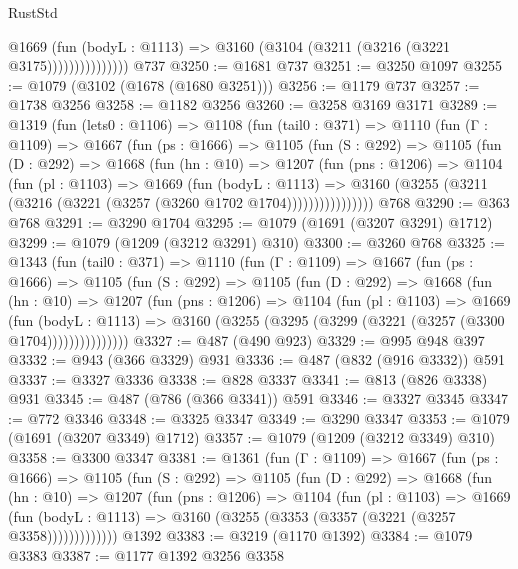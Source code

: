\begin{lexlean}{RustStd}
\begin{coremodule}
                      @1669
                        (fun (bodyL : @1113) =>
                        @3160 (@3104 (@3211 (@3216 (@3221 @3175)))))))))))))))
    @737
@3250 := @1681 @737
@3251 := @3250 @1097
@3255 := @1079 (@3102 (@1678 (@1680 @3251)))
@3256 := @1179 @737
@3257 := @1738 @3256
@3258 := @1182 @3256
@3260 := @3258 @3169 @3171
@3289 := @1319
    (fun (lets0 : @1106) =>
    @1108
      (fun (tail0 : @371) =>
      @1110
        (fun (Γ : @1109) =>
        @1667
          (fun (ps : @1666) =>
          @1105
            (fun (S : @292) =>
            @1105
              (fun (D : @292) =>
              @1668
                (fun (hn : @10) =>
                @1207
                  (fun (pns : @1206) =>
                  @1104
                    (fun (pl : @1103) =>
                    @1669
                      (fun (bodyL : @1113) =>
                      @3160 (@3255 (@3211 (@3216 (@3221 (@3257 (@3260 @1702 @1704))))))))))))))))
    @768
@3290 := @363 @768
@3291 := @3290 @1704
@3295 := @1079 (@1691 (@3207 @3291) @1712)
@3299 := @1079 (@1209 (@3212 @3291) @310)
@3300 := @3260 @768
@3325 := @1343
    (fun (tail0 : @371) =>
    @1110
      (fun (Γ : @1109) =>
      @1667
        (fun (ps : @1666) =>
        @1105
          (fun (S : @292) =>
          @1105
            (fun (D : @292) =>
            @1668
              (fun (hn : @10) =>
              @1207
                (fun (pns : @1206) =>
                @1104
                  (fun (pl : @1103) =>
                  @1669
                    (fun (bodyL : @1113) =>
                    @3160 (@3255 (@3295 (@3299 (@3221 (@3257 (@3300 @1704)))))))))))))))
@3327 := @487 (@490 @923)
@3329 := @995 @948 @397
@3332 := @943 (@366 @3329) @931
@3336 := @487 (@832 (@916 @3332)) @591
@3337 := @3327 @3336
@3338 := @828 @3337
@3341 := @813 (@826 @3338) @931
@3345 := @487 (@786 (@366 @3341)) @591
@3346 := @3327 @3345
@3347 := @772 @3346
@3348 := @3325 @3347
@3349 := @3290 @3347
@3353 := @1079 (@1691 (@3207 @3349) @1712)
@3357 := @1079 (@1209 (@3212 @3349) @310)
@3358 := @3300 @3347
@3381 := @1361
    (fun (Γ : @1109) =>
    @1667
      (fun (ps : @1666) =>
      @1105
        (fun (S : @292) =>
        @1105
          (fun (D : @292) =>
          @1668
            (fun (hn : @10) =>
            @1207
              (fun (pns : @1206) =>
              @1104
                (fun (pl : @1103) =>
                @1669
                  (fun (bodyL : @1113) =>
                  @3160 (@3255 (@3353 (@3357 (@3221 (@3257 @3358)))))))))))))
    @1392
@3383 := @3219 (@1170 @1392)
@3384 := @1079 @3383
@3387 := @1177 @1392 @3256 @3358

\end{coremodule}
\end{lexlean}
